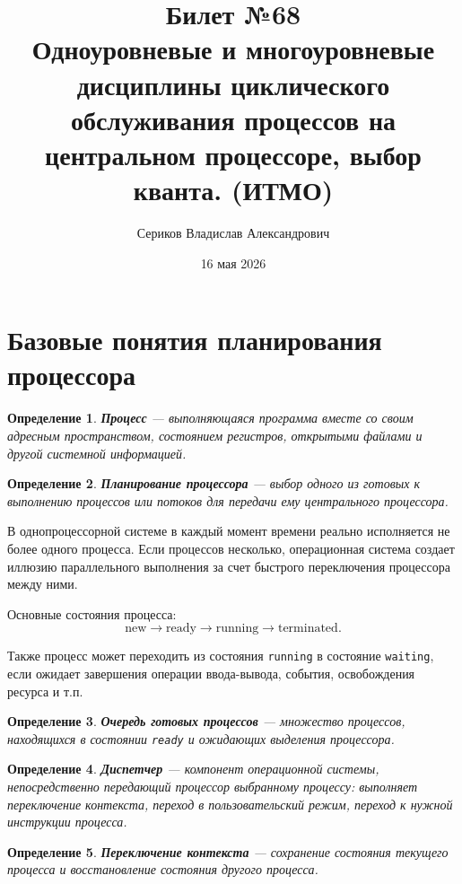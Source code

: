 \documentclass[12pt,a4paper]{article}
\title{Билет №68 \\ \small Одноуровневые и многоуровневые дисциплины циклического обслуживания процессов на центральном процессоре, выбор кванта. (ИТМО)}
\author{Сериков Владислав Александрович}
\date{16 мая 2026}
\newtheorem{definition}{Определение}
\begin{document}
\maketitle
\tableofcontents
\newpage

\section{Базовые понятия планирования процессора}

\begin{definition}
\textbf{Процесс} --- выполняющаяся программа вместе со своим адресным пространством, состоянием регистров, открытыми файлами и другой системной информацией.
\end{definition}

\begin{definition}
\textbf{Планирование процессора} --- выбор одного из готовых к выполнению процессов или потоков для передачи ему центрального процессора.
\end{definition}

В однопроцессорной системе в каждый момент времени реально исполняется не более одного процесса. Если процессов несколько, операционная система создает иллюзию параллельного выполнения за счет быстрого переключения процессора между ними.

Основные состояния процесса:
\[
\text{new} \rightarrow \text{ready} \rightarrow \text{running} \rightarrow \text{terminated}.
\]

Также процесс может переходить из состояния \texttt{running} в состояние \texttt{waiting}, если ожидает завершения операции ввода-вывода, события, освобождения ресурса и т.п.

\begin{definition}
\textbf{Очередь готовых процессов} --- множество процессов, находящихся в состоянии \texttt{ready} и ожидающих выделения процессора.
\end{definition}

\begin{definition}
\textbf{Диспетчер} --- компонент операционной системы, непосредственно передающий процессор выбранному процессу: выполняет переключение контекста, переход в пользовательский режим, переход к нужной инструкции процесса.
\end{definition}

\begin{definition}
\textbf{Переключение контекста} --- сохранение состояния текущего процесса и восстановление состояния другого процесса.
\end{definition}
\end{document}
